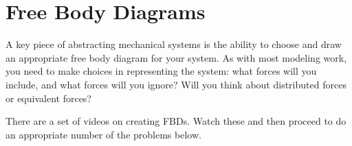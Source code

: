 \documentclass{tufte-handout}
\newcommand{\be}{\begin{enumerate}}
\newcommand{\ee}{\end{enumerate}}
\begin{document}
\begin{enumerate}
\begin{enumerate}[resume]
%
\end{enumerate}


\clearpage

\section{Free Body Diagrams}

A key piece of abstracting mechanical systems is the ability to choose and draw an appropriate free body diagram for your system.  As with most modeling work, you need to make choices in representing the system: what forces will you include, and what forces will you ignore?  Will you think about distributed forces or equivalent forces?

There are a set of videos on creating FBDs.  Watch these and then proceed to do an appropriate number of  the problems below.

\begin{enumerate}[resume]




\end{enumerate}
\end{enumerate}
\end{document}
